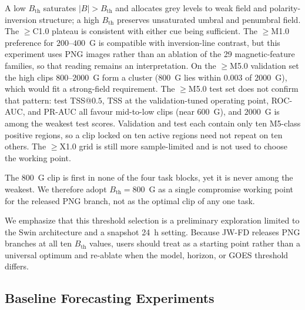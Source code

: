 \documentclass[universe,article,submit,moreauthors]{Definitions/mdpi}
\newif\ifrevision
\newcommand{\add}[1]{\ifrevision\textcolor{blue}{#1}\else#1\fi}
\newcommand{\del}[1]{\ifrevision\textcolor{red}{\sout{#1}}\else\fi}
\newcommand{\chg}[2]{\del{#1}\add{#2}}
\begin{document}
\add{A low $B_{\mathrm{th}}$ saturates $|B|>B_{\mathrm{th}}$ and allocates grey levels to weak field and polarity-inversion structure; a high $B_{\mathrm{th}}$ preserves unsaturated umbral and penumbral field. The $\geq$C1.0 plateau is consistent with either cue being sufficient. The $\geq$M1.0 preference for $200$--$400$~G is compatible with inversion-line contrast, but this experiment uses PNG images rather than an ablation of the 29 magnetic-feature families, so that reading remains an interpretation. On the $\geq$M5.0 validation set the high clips $800$--$2000$~G form a cluster ($800$~G lies within $0.003$ of $2000$~G), which would fit a strong-field requirement. The $\geq$M5.0 test set does not confirm that pattern: test TSS@$0.5$, TSS at the validation-tuned operating point, ROC-AUC, and PR-AUC all favour mid-to-low clips (near $600$~G), and $2000$~G is among the weakest test scores. Validation and test each contain only ten M5-class positive regions, so a clip locked on ten active regions need not repeat on ten others. The $\geq$X1.0 grid is still more sample-limited and is not used to choose the working point.}

\add{The $800$~G clip is first in none of the four task blocks, yet it is never among the weakest. We therefore adopt $B_{\mathrm{th}}=800$~G as a single compromise working point for the released PNG branch, not as the optimal clip of any one task.}

We emphasize that this threshold selection is a preliminary exploration limited to the Swin architecture and a snapshot 24~h setting. Because JW-FD releases PNG branches at all ten $B_{\mathrm{th}}$ values, users should treat \chg{1000~G}{the $800$~G compromise} as a starting point rather than a universal optimum and re-ablate when the model, horizon, or GOES threshold differs. \del{That first ablation also omitted 1200, 1400, 1600, and 1800~G. After the 19-AR rebalance, both this ten-threshold grid and the four-model 24~h baselines need to be retrained on the released assignment: four isolated-X regions that were in the seed-62 training set now sit in the test set, so the present checkpoints cannot be scored on the released split.}

\subsection{Baseline Forecasting Experiments}
\label{sec:baseline}
\end{document}
